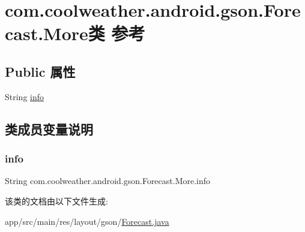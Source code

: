 \hypertarget{classcom_1_1coolweather_1_1android_1_1gson_1_1_forecast_1_1_more}{}\section{com.\+coolweather.\+android.\+gson.\+Forecast.\+More类 参考}
\label{classcom_1_1coolweather_1_1android_1_1gson_1_1_forecast_1_1_more}
\subsection*{Public 属性}
\begin{DoxyCompactItemize}
\item 
String \mbox{\hyperlink{classcom_1_1coolweather_1_1android_1_1gson_1_1_forecast_1_1_more_a6dc1ad30eaff748f19ac2685fc1d08ff}{info}}
\end{DoxyCompactItemize}


\subsection{类成员变量说明}
\mbox{\label{classcom_1_1coolweather_1_1android_1_1gson_1_1_forecast_1_1_more_a6dc1ad30eaff748f19ac2685fc1d08ff}} 
\subsubsection{\texorpdfstring{info}{info}}
{\footnotesize\ttfamily String com.\+coolweather.\+android.\+gson.\+Forecast.\+More.\+info}



该类的文档由以下文件生成\+:\begin{DoxyCompactItemize}
\item 
app/src/main/res/layout/gson/\mbox{\hyperlink{res_2layout_2gson_2_forecast_8java}{Forecast.\+java}}\end{DoxyCompactItemize}
